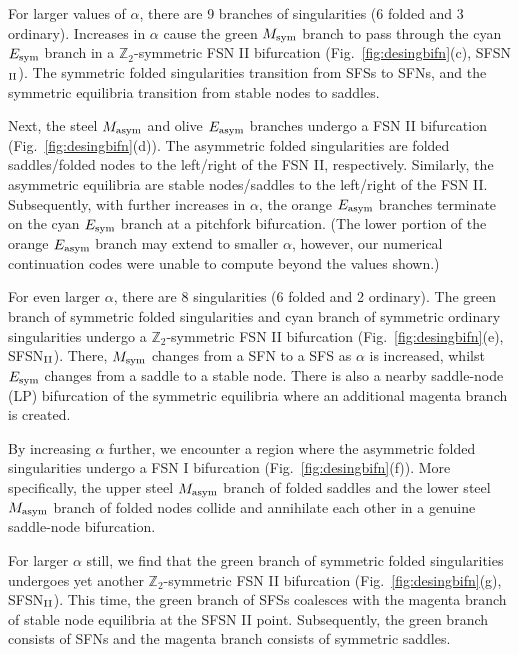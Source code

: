 \documentclass[10pt,onecolumn]{article}
\theoremstyle{plain}
\begin{document}
For larger values of $\alpha$, there are 9 branches of singularities (6 folded and 3 ordinary). Increases in $\alpha$ cause the green $M_{\rm sym}$ branch to pass through the cyan $E_{\rm sym}$ branch in a $\mathbb Z_2$-symmetric FSN II bifurcation (Fig.~\ref{fig:desingbifn}(c), SFSN$_{\rm II}$). The symmetric folded singularities transition from SFSs to SFNs, and the symmetric equilibria transition from stable nodes to saddles. 

Next, the steel $M_{\rm asym}$ and olive $E_{\rm asym}$ branches undergo a FSN II bifurcation (Fig.~\ref{fig:desingbifn}(d)). The asymmetric folded singularities are folded saddles/folded nodes to the left/right of the FSN II, respectively.
Similarly, the asymmetric equilibria are stable nodes/saddles to the left/right of the FSN II. 
Subsequently, with further increases in $\alpha$, the orange $E_{\rm asym}$ branches terminate on the cyan $E_{\rm sym}$ branch at a pitchfork bifurcation. (The lower portion of the orange $E_{\rm asym}$ branch may extend to smaller $\alpha$, however, our numerical continuation codes were unable to compute beyond the values shown.) 

For even larger $\alpha$, there are 8 singularities (6 folded and 2 ordinary). The green branch of symmetric folded singularities and cyan branch of symmetric ordinary singularities undergo a $\mathbb Z_2$-symmetric FSN II bifurcation (Fig.~\ref{fig:desingbifn}(e), SFSN$_{\rm II}$). There, $M_{\rm sym}$ changes from a SFN to a SFS as $\alpha$ is increased, whilst $E_{\rm sym}$ changes from a saddle to a stable node. There is also a nearby saddle-node (LP) bifurcation of the symmetric equilibria where an additional magenta branch is created. 

By increasing $\alpha$ further, we encounter a region where the asymmetric folded singularities undergo a FSN I bifurcation (Fig.~\ref{fig:desingbifn}(f)). More specifically, the upper steel $M_{\rm asym}$ branch of folded saddles and the lower steel $M_{\rm asym}$ branch of folded nodes collide and annihilate each other in a genuine saddle-node bifurcation. 

For larger $\alpha$ still, we find that the green branch of symmetric folded singularities undergoes yet another $\mathbb Z_2$-symmetric FSN II bifurcation (Fig.~\ref{fig:desingbifn}(g), SFSN$_{\rm II}$). This time, the green branch of SFSs coalesces with the magenta branch of stable node equilibria at the SFSN II point. Subsequently, the green branch consists of SFNs and the magenta branch consists of symmetric saddles. 
\end{document}
